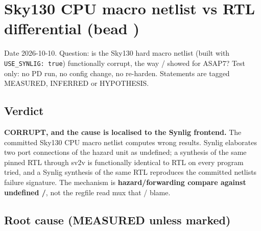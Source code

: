 \section{\texorpdfstring{Sky130 CPU macro netlist vs RTL differential
(bead
)}{Sky130 CPU macro netlist vs RTL differential (bead )}}\label{cr:defect:sky130-cpu-synlig-dud4}

\begin{record}

Date 2026-10-10. Question: is the Sky130  hard macro
netlist (built with
\texttt{USE\_\allowbreak{}SYNLIG:\allowbreak{}\ true}) functionally
corrupt, the way / showed for ASAP7? Test only: no
PD run, no config change, no re-harden. Statements are tagged MEASURED,
INFERRED or HYPOTHESIS.

\end{record}

\subsection{Verdict}\label{cr:defect:sky130-cpu-synlig-dud4:verdict}

\begin{record}

\textbf{CORRUPT, and the cause is localised to the Synlig frontend.} The
committed Sky130 CPU macro netlist computes wrong results. Synlig
elaborates two port connections of the hazard unit as undefined; a
synthesis of the same pinned RTL through sv2v is functionally identical
to RTL on every program tried, and a Synlig synthesis of the same RTL
reproduces the committed netlist\textquotesingle s failure signature.
The mechanism is \textbf{hazard/\allowbreak{}forwarding compare against
undefined /}, not the regfile read mux that
/ blame.

\end{record}

\subsection{Root cause (MEASURED unless marked)}\label{cr:defect:sky130-cpu-synlig-dud4:root-cause-measured-unless-marked}

